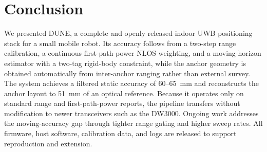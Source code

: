 \section{Conclusion}
\label{sec:conclusion}

We presented DUNE, a complete and openly released indoor UWB positioning
stack for a small mobile robot. Its accuracy follows from a two-step
range calibration, a continuous first-path-power NLOS weighting, and a
moving-horizon estimator with a two-tag rigid-body constraint, while the
anchor geometry is obtained automatically from inter-anchor ranging
rather than external survey. The system achieves a filtered static
accuracy of \SI{60}{}--\SI{65}{\milli\meter} and reconstructs the anchor
layout to \SI{51}{\milli\meter} of an optical reference. Because it
operates only on standard range and first-path-power reports, the
pipeline transfers without modification to newer transceivers such as the
DW3000. Ongoing work addresses the moving-accuracy gap through tighter
range gating and higher sweep rates. All firmware, host software,
calibration data, and logs are released to support reproduction and
extension.
